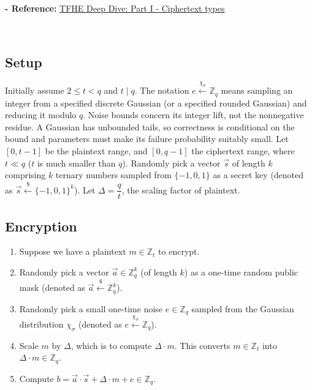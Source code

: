 
\textbf{- Reference:} 
\href{https://www.zama.ai/post/tfhe-deep-dive-part-1}{TFHE Deep Dive: Part I - Ciphertext types}~\cite{tfhe-1}



$ $




\subsection{Setup}

Initially assume $2\le t<q$ and $t\mid q$. The notation $e\xleftarrow{\chi_\sigma}\mathbb Z_q$ means sampling an integer from a specified discrete Gaussian (or a specified rounded Gaussian) and reducing it modulo $q$. Noise bounds concern its integer lift, not the nonnegative residue. A Gaussian has unbounded tails, so correctness is conditional on the bound and parameters must make its failure probability suitably small.
Let $[0, t-1]$ be the plaintext range, and $[0, q-1]$ the ciphertext range, where $t \ll q$ ($t$ is much smaller than $q$). Randomly pick a vector $\vec{s}$ of length $k$ comprising $k$ ternary numbers sampled from $\{-1, 0, 1\}$ as a secret key (denoted as $\vec{s} \xleftarrow{\$} \{-1, 0, 1\}^k$). Let $\Delta = \dfrac{q}{t}$, the scaling factor of plaintext.

\subsection{Encryption}
\label{subsec:lwe-enc}

\begin{enumerate}
\item Suppose we have a plaintext $m \in \mathbb{Z}_t$ to encrypt. \item Randomly pick a vector $\vec{a} \in \mathbb{Z}_q^k$ (of length $k$) as a one-time random public mask (denoted as $\vec{a} \xleftarrow{\$} \mathbb{Z}_q^k$).
\item Randomly pick a small one-time noise $e \in \mathbb{Z}_q$ sampled from the Gaussian distribution $\chi_\sigma$ (denoted as $e \xleftarrow{\chi_\sigma} \mathbb{Z}_q$). 
\item Scale $m$ by $\Delta$, which is to compute $\Delta \cdot m$. This converts $m \in \mathbb{Z}_t$ into $\Delta \cdot m \in \mathbb{Z}_q$.
\item Compute $b = \vec{a} \cdot \vec{s} + \Delta \cdot m + e \in \mathbb{Z}_q$. 
\end{enumerate}

$ $

